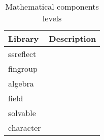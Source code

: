 \begin{table}[tb]
\begin{tabular}{l l}
\toprule
Library & Description \\
\midrule
ssreflect &  \\
fingroup & \\
algebra & \\
field & \\
solvable \\
character \\
\bottomrule
\end{tabular}
\caption{Mathematical components levels}\label{tab:mathcomp}
\end{table}